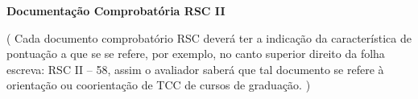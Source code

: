\label{documentacao-probatoria-rsc-ii}

\begin{center}
	\begin{LARGE}
		\textbf{Documentação Comprobatória RSC II}
	\end{LARGE}
\end{center}

\begin{center}
	{\color{red}
		( Cada documento comprobatório RSC deverá ter a indicação da característica de pontuação a que se se refere, por exemplo, no canto superior direito da folha escreva: RSC II – 58, assim o avaliador saberá que tal documento se refere à orientação ou coorientação  de TCC de cursos de graduação. )
	}
\end{center}
